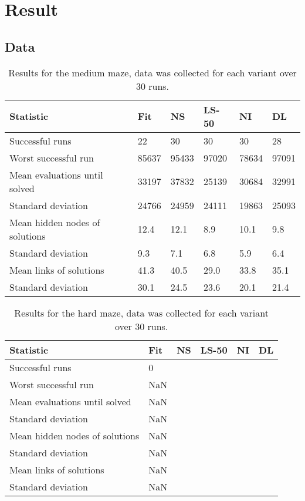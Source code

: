 \section{Result}
\label{sec:Result}

\subsection{Data}
\begin{table}[H]
    \centering
    \begin{tabular}{llllll}
    \toprule
    Statistic & \multicolumn{1}{l}{Fit} & \multicolumn{1}{l}{NS} & \multicolumn{1}{l}{LS-50} & \multicolumn{1}{l}{NI} & \multicolumn{1}{l}{DL} \\
    \midrule
    Successful runs & 22 & 30 & 30 & 30 & 28 \\
    Worst successful run & 85637 & 95433 & 97020 & 78634 & 97091 \\
    \rowcolor[gray]{.9} Mean evaluations until solved & 33197 & 37832 & 25139 & 30684 & 32991 \\
    Standard deviation & 24766  & 24959 & 24111 & 19863 & 25093 \\
    \rowcolor[gray]{.9} Mean hidden nodes of solutions & 12.4 & 12.1  & 8.9  & 10.1 & 9.8 \\
    Standard deviation & 9.3 & 7.1 & 6.8 & 5.9 & 6.4 \\
    \rowcolor[gray]{.9} Mean links of solutions & 41.3  & 40.5 & 29.0 & 33.8 & 35.1 \\
    Standard deviation & 30.1  & 24.5 & 23.6 & 20.1 & 21.4\\
    \bottomrule
    \end{tabular}
    \caption{Results for the medium maze, data was collected for each variant over 30 runs.}
    \label{medium}
\end{table}


\begin{table}[H]
    \centering
    \begin{tabular}{llllll}
    \toprule
    Statistic & \multicolumn{1}{l}{Fit} & \multicolumn{1}{l}{NS} & \multicolumn{1}{l}{LS-50} &  \multicolumn{1}{l}{NI} & \multicolumn{1}{l}{DL} \\
    \midrule
    Successful runs & 0 &  &  & & \\
    Worst successful run & NaN &  &  & & \\
    \rowcolor[gray]{.9} Mean evaluations until solved & NaN &  &  & & \\
    Standard deviation & NaN  &  &  & \\
    \rowcolor[gray]{.9} Mean hidden nodes of solutions & NaN &  &  & & \\
    Standard deviation & NaN &  &  &  \\
    \rowcolor[gray]{.9} Mean links of solutions & NaN  &  &  &  & \\
    Standard deviation & NaN  &  &  & & \\
    \bottomrule
    \end{tabular}
    \caption{Results for the hard maze, data was collected for each variant over 30 runs.}
    \label{hard}
\end{table}

